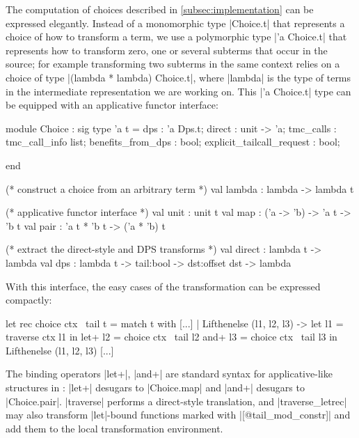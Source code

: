 The computation of choices described in \cref{subsec:implementation} can be expressed elegantly. Instead of a monomorphic type \ocaml|Choice.t| that represents a choice of how to transform a term, we use a polymorphic type \ocaml|'a Choice.t| that represents how to transform zero, one or several subterms that occur in the source; for example transforming two subterms in the same context relies on a choice of type \ocaml|(lambda * lambda) Choice.t|, where \ocaml|lambda| is the type of terms in the intermediate representation we are working on. This \ocaml|'a Choice.t| type can be equipped with an applicative functor interface:

\begin{minipage}{0.4\linewidth}
\begin{Ocaml}
module Choice : sig
  type 'a t = {
    dps : 'a Dps.t;
    direct : unit -> 'a;
    tmc_calls : tmc_call_info list;
    benefits_from_dps : bool;
    explicit_tailcall_request : bool;
  }





end
\end{Ocaml}
\end{minipage}
\hfill
\begin{minipage}{0.5\linewidth}
\begin{Ocaml}
  (* construct a choice from an arbitrary term *)
  val lambda : lambda -> lambda t

  (* applicative functor interface *)
  val unit : unit t
  val map : ('a -> 'b) -> 'a t -> 'b t
  val pair : 'a t * 'b t -> ('a * 'b) t

  (* extract the direct-style and DPS transforms *)
  val direct : lambda t -> lambda
  val dps :
    lambda t -> tail:bool -> dst:offset dst ->
    lambda
\end{Ocaml}
\end{minipage}

With this interface, the easy cases of the transformation can be expressed compactly:
\begin{Ocaml}
  let rec choice ctx ~tail t =
    match t with
    [...]
    | Lifthenelse (l1, l2, l3) ->
        let l1 = traverse ctx l1 in
        let+ l2 = choice ctx ~tail l2
        and+ l3 = choice ctx ~tail l3
        in Lifthenelse (l1, l2, l3)
    [...]
\end{Ocaml}
The binding operators \ocaml|let+|, \ocaml|and+| are standard syntax for applicative-like structures in \OCaml: \ocaml|let+| desugars to \ocaml|Choice.map| and \ocaml|and+| desugars to \ocaml|Choice.pair|. \ocaml|traverse| performs a direct-style translation, and \ocaml|traverse_letrec| may also transform \ocaml|let|-bound functions marked with \ocaml|[@tail_mod_constr]| and add them to the local transformation environment.

